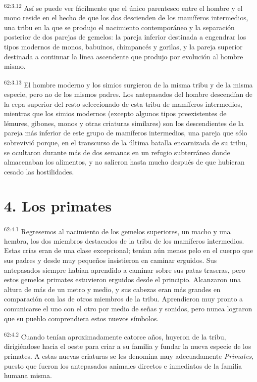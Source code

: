 \par
\textsuperscript{62:3.12} Así se puede ver fácilmente que el único parentesco entre el hombre y el mono reside en el hecho de que los dos descienden de los mamíferos intermedios, una tribu en la que se produjo el nacimiento contemporáneo y la separación posterior de dos parejas de gemelos: la pareja inferior destinada a engendrar los tipos modernos de monos, babuinos, chimpancés y gorilas, y la pareja superior destinada a continuar la línea ascendente que produjo por evolución al hombre mismo.

\par
\textsuperscript{62:3.13} El hombre moderno y los simios surgieron de la misma tribu y de la misma especie, pero no de los mismos padres. Los antepasados del hombre descendían de la cepa superior del resto seleccionado de esta tribu de mamíferos intermedios, mientras que los simios modernos (excepto algunos tipos preexistentes de lémures, gibones, monos y otras criaturas similares) son los descendientes de la pareja más inferior de este grupo de mamíferos intermedios, una pareja que sólo sobrevivió porque, en el transcurso de la última batalla encarnizada de su tribu, se ocultaron durante más de dos semanas en un refugio subterráneo donde almacenaban los alimentos, y no salieron hasta mucho después de que hubieran cesado las hostilidades.

\section*{4. Los primates}
\par
\textsuperscript{62:4.1} Regresemos al nacimiento de los gemelos superiores, un macho y una hembra, los dos miembros destacados de la tribu de los mamíferos intermedios. Estas crías eran de una clase excepcional; tenían aún menos pelo en el cuerpo que sus padres y desde muy pequeños insistieron en caminar erguidos. Sus antepasados siempre habían aprendido a caminar sobre sus patas traseras, pero estos gemelos primates estuvieron erguidos desde el principio. Alcanzaron una altura de más de un metro y medio, y sus cabezas eran más grandes en comparación con las de otros miembros de la tribu. Aprendieron muy pronto a comunicarse el uno con el otro por medio de señas y sonidos, pero nunca lograron que su pueblo comprendiera estos nuevos símbolos.

\par
\textsuperscript{62:4.2} Cuando tenían aproximadamente catorce años, huyeron de la tribu, dirigiéndose hacia el oeste para criar a su familia y fundar la nueva especie de los primates. A estas nuevas criaturas se les denomina muy adecuadamente \textit{Primates}, puesto que fueron los antepasados animales directos e inmediatos de la familia humana misma.

